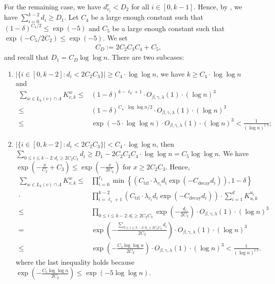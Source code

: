 \documentclass[11pt]{amsart}
\newcommand{\tp}[1]{{\left( #1 \right)}}
\newcommand{\defeq}{:=}
\theoremstyle{definition}
\theoremstyle{remark}
\begin{document}
For the remaining case, we have $d_{v_i}^c < D_2$ for all $i \in [0,k-1]$. Hence, by , we have $\sum_{i=0}^{k-2}d_i\geq D_1$.
Let $C_4$ be a large enough constant such that $(1-\delta)^{C_4/2}\leq \exp(-5)$ and $C_5$ be a large enough constant such that $\exp(-C_5/2C_2)\leq \exp(-5)$. We set 
\begin{align}\label{eq:C_D-definition}
  C_D\defeq2C_2C_3C_4+C_5,
\end{align}
and recall that $D_1=C_D\log\log n$.
There are two subcases: 
\begin{enumerate}
    \item $|\{i\in [0,k-2]:d_i< 2C_2 C_3 \}|\geq C_4\cdot \log \log n$, we have $k\geq C_4\cdot \log \log n$ and
    \begin{align*}
        \sum_{w\in L_k(v) \cap \Lambda}K_{v,k}^{w}\leq &(1-\delta)^{k-\ell_0+1} \cdot O_{\beta,\gamma,\lambda}(1) \cdot (\log n)^3\\
        \leq &(1-\delta)^{C_4\cdot \log \log n/2} \cdot O_{\beta,\gamma,\lambda}(1) \cdot (\log n)^3\\
        \leq &\exp(-5 \cdot \log\log n) \cdot O_{\beta,\gamma,\lambda}(1) \cdot (\log n)^3 < \frac{1}{(\log n)^{1.5}};
    \end{align*}
    \item $|\{i\in [0,k-2]:d_i< 2C_2 C_3\}|< C_4\cdot \log \log n$, then 
    $\sum_{0\leq i\leq k-2:d_i\geq 2C_2C_3}d_i\geq D_1 - 2C_2 C_3C_4\cdot \log \log n=C_5\log \log n$. We have $\exp\left (-\frac{x}{C_2}+C_3\right )\leq \exp\left (-\frac{x}{2C_2}\right )$ for $x\geq 2C_2 C_3$. 
    Hence,
    \begin{align*}
        \sum_{w\in L_k(v) \cap \Lambda}K_{v,k}^{w}\leq &\prod_{i=0}^{\ell_1}\min\left \{\tp{C_{\text{trl}} \cdot\lambda_{v_i}d_i \exp(-C_{\text{decay}}d_i)},1-\delta\right \}\\
        \cdot&\prod_{i=\ell_1+1}^{k-2}\tp{C_{\text{trl}} \cdot \lambda_{v_i} d_i \exp(-C_{\text{decay}}d_i)} \cdot \sum_{i=1}^d K_{u,k}^{u_i}\\
        \leq &\prod_{0\leq i\leq k-2:d_i\geq 2C_2C_3}\exp\left (-\frac{d_i}{2C_2}\right ) \cdot O_{\beta,\gamma,\lambda}(1) \cdot (\log n)^3\\
        =&\exp\left(-\frac{\sum_{0\leq i\leq k-2:d_i\geq 2C_2C_3}d_i}{2C_2}\right)\cdot O_{\beta,\gamma,\lambda}(1) \cdot (\log n)^3\\
        \leq& \exp\left (-\frac{C_5\log \log n}{2C_2}\right )\cdot O_{\beta,\gamma,\lambda}(1) \cdot (\log n)^3 < \frac{1}{(\log n)^{1.5}}.
    \end{align*}
    where the last inequality holds because $\exp(-\frac{C_5\log \log n}{2C_2}) \leq \exp(-5\log \log n)$.
\end{enumerate}
\end{document}
